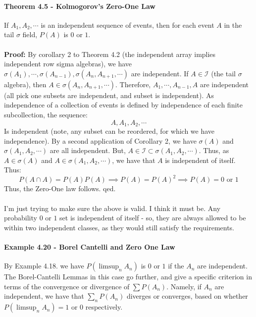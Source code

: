 \documentclass[12pt,a4paper]{article}
\newcommand{\1}[1]{\mathbbm{1}\left\{ #1 \right\}}
\newcommand{\ical}{\mathcal{I}}
\begin{document}
\paragraph{Theorem 4.5 - Kolmogorov's Zero-One Law} If $A_1, A_2, \cdots$ is an independent sequence of events, then for each event $A$ in the tail $\sigma$ field, $P(A)$ is $0$ or $1$.
\\\\
\textbf{Proof:} By corollary 2 to Theorem 4.2 (the independent array implies independent row sigma algebras), we have $\sigma(A_1), \cdots, \sigma(A_{n-1}), \sigma(A_n, A_{n+1}, \cdots)$ are independent. If $A \in \ical$ (the tail $\sigma$ algebra), then $A \in \sigma(A_n, A_{n+1}, \cdots)$. Therefore, $A_1, \cdots, A_{n-1}, A$ are independent (all pick one subsets are independent, and subset is independent). As independence of a collection of events is defined by independence of each finite subcollection, the sequence:
$$
	A, A_1, A_2, \cdots
$$
Is independent (note, any subset can be reordered, for which we have independence). By a second application of Corollary 2, we have $\sigma(A)$ and $\sigma(A_1, A_2, \cdots)$ are all independent. But, $A \in \ical \subset \sigma(A_1, A_2, \cdots)$. Thus, as $A \in \sigma(A)$ and $A \in \sigma(A_1, A_2, \cdots)$, we have that $A$ is independent of itself. Thus:
$$
	P(A \cap A) = P(A)P(A) \implies
	P(A) = P(A)^2 \implies
	P(A) = \text{0 or 1}
$$
Thus, the Zero-One law follows. qed.
\\\\
I'm just trying to make sure the above is valid. I think it must be. Any probability $0$ or $1$ set is independent of itself - so, they are always allowed to be within two independent classes, as they would still satisfy the requirements.

\paragraph{Example 4.20 - Borel Cantelli and Zero One Law} By Example 4.18. we have $P(\limsup_n A_n)$ is $0$ or $1$ if the $A_n$ are independent. The Borel-Cantelli Lemmas in this case go further, and give a specific criterion in terms of the convergence or divergence of $\sum P(A_n)$. Namely, if $A_n$ are independent, we have that $\sum_n P(A_n)$ diverges or converges, based on whether $P(\limsup_n A_n) = 1$ or $0$ respectively.
\end{document}
